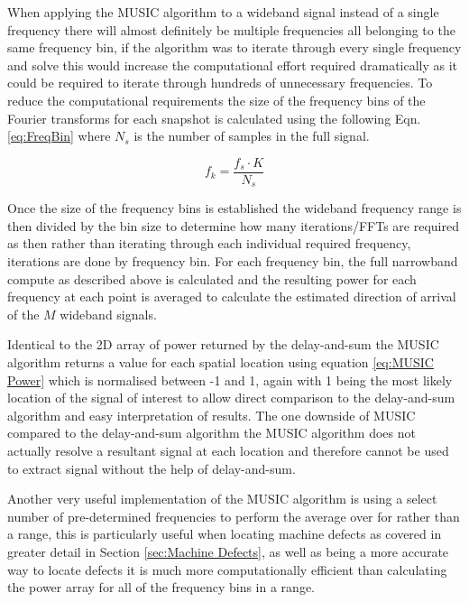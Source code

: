 \documentclass{UoNMCHA}
\numberwithin{equation}{section}
\begin{document}
    When applying the MUSIC algorithm to a wideband signal instead of a single frequency there will almost definitely be multiple frequencies all belonging to the same frequency bin, if the algorithm was to iterate through every single frequency and solve this would increase the computational effort required dramatically as it could be required to iterate through hundreds of unnecessary frequencies. To reduce the computational requirements the size of the frequency bins of the Fourier transforms for each snapshot is calculated using the following Eqn. \ref{eq:FreqBin} where $N_s$ is the number of samples in the full signal.
    
    \begin{equation}
        f_{k} =\frac{f_s \cdot K}{N_s}
        \label{eq:FreqBin}
    \end{equation}
    
    Once the size of the frequency bins is established the wideband frequency range is then divided by the bin size to determine how many iterations/FFTs are required as then rather than iterating through each individual required frequency, iterations are done by frequency bin. For each frequency bin, the full narrowband compute as described above is calculated and the resulting power for each frequency at each point is averaged to calculate the estimated direction of arrival of the $M$ wideband signals.
    
    Identical to the 2D array of power returned by the delay-and-sum the MUSIC algorithm returns a value for each spatial location using equation \ref{eq:MUSIC Power} which is normalised between -1 and 1, again with 1 being the most likely location of the signal of interest to allow direct comparison to the delay-and-sum algorithm and easy interpretation of results. The one downside of MUSIC compared to the delay-and-sum algorithm the MUSIC algorithm does not actually resolve a resultant signal at each location and therefore cannot be used to extract signal without the help of delay-and-sum. 
    
    Another very useful implementation of the MUSIC algorithm is using a select number of pre-determined frequencies to perform the average over for rather than a range, this is particularly useful when locating machine defects as covered in greater detail in Section \ref{sec:Machine Defects}, as well as being a more accurate way to locate defects it is much more computationally efficient than calculating the power array for all of the frequency bins in a range.
    
\end{document}
